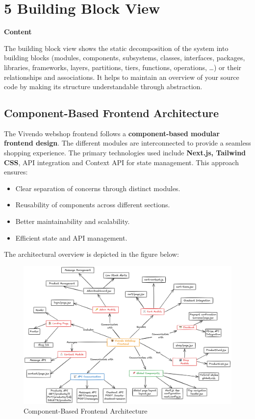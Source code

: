 \hypertarget{section-building-block-view}{%
\section{5 Building Block View}\label{section-building-block-view}}

\textbf{Content}

The building block view shows the static decomposition of the system into building blocks (modules, components, subsystems, classes, interfaces, packages, libraries, frameworks, layers, partitions, tiers, functions, operations, \ldots) or their relationships and associations. It helps to maintain an overview of your source code by making its structure understandable through abstraction.

\subsection{Component-Based Frontend Architecture}
The Vivendo webshop frontend follows a \textbf{component-based modular frontend design}. The different modules are interconnected to provide a seamless shopping experience. The primary technologies used include \textbf{Next.js, Tailwind CSS}, API integration and Context API for state management. This approach ensures:
\begin{itemize}
    \item Clear separation of concerns through distinct modules.
    \item Reusability of components across different sections.
    \item Better maintainability and scalability.
    \item Efficient state and API management.
\end{itemize}
The architectural overview is depicted in the figure below:

\begin{figure}[h]
    \centering
    \includegraphics[width=\textwidth]{images/New_frontend_architecture.png}
    \caption{Component-Based Frontend Architecture}
    \label{fig:architecture}
\end{figure}

